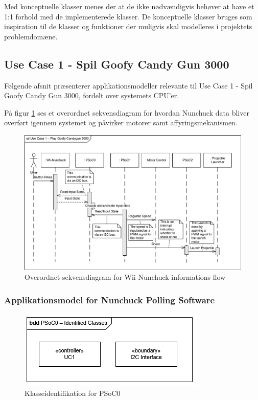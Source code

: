 \noindent Med konceptuelle klasser menes der at de ikke nødvændigvis behøver at have et 1:1 forhold med de implementerede klasser. De konceptuelle klasser bruges som inspiration til de klasser og funktioner der muligvis skal modelleres i projektets problemdomæne. 

\subsection{Use Case 1 - Spil Goofy Candy Gun 3000}

Følgende afsnit præsenterer applikationsmodeller relevante til Use Case 1 - Spil Goofy Candy Gun 3000, fordelt over systemets CPU'er.

På figur \ref{fig:WiiNunchuckSequenceDiagram} ses et overordnet sekvensdiagram for hvordan Nunchuck data bliver overført igennem systemet og påvirker motorer samt affyringsmekanismen.

\begin{figure}[H]
	\centering
	\includegraphics[width=\textwidth]{Systemarkitektur/images/SequenceDiagramUC1}
	\caption{Overordnet sekvensdiagram for Wii-Nunchuck informations flow}
	\label{fig:WiiNunchuckSequenceDiagram}
\end{figure}

\subsubsection{Applikationsmodel for Nunchuck Polling Software}

\begin{figure}[H]
	\centering
	\includegraphics[scale=0.8]{Systemarkitektur/images/klasseIdentificationUC1PSoC0}
	\caption{Klasseidentifikation for PSoC0}
	\label{fig:klasseidentifikationUC1PSoC0}
\end{figure}

